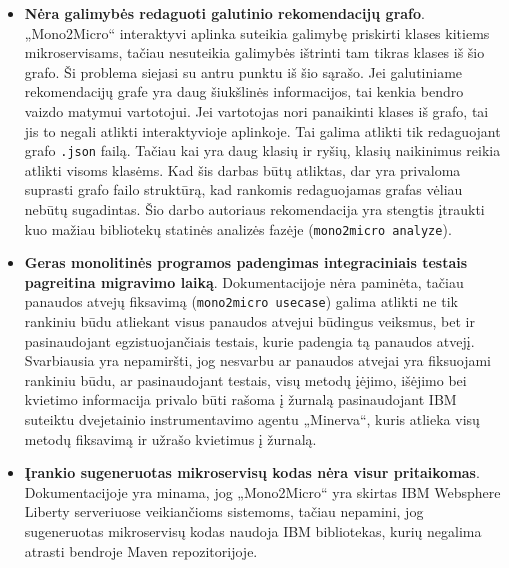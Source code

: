 \documentclass{VUMIFPSbakalaurinis}
\begin{document}
\begin{itemize}
    \item \textbf{Nėra galimybės redaguoti galutinio rekomendacijų grafo}. „Mono2Micro“ interaktyvi aplinka suteikia galimybę priskirti klases kitiems mikroservisams, tačiau nesuteikia galimybės ištrinti tam tikras klases iš šio grafo. Ši problema siejasi su antru punktu iš šio sąrašo. Jei galutiniame rekomendacijų grafe yra daug šiukšlinės informacijos, tai kenkia bendro vaizdo matymui vartotojui. Jei vartotojas nori panaikinti klases iš grafo, tai jis to negali atlikti interaktyvioje aplinkoje. Tai galima atlikti tik redaguojant grafo \verb|.json| failą. Tačiau kai yra daug klasių ir ryšių, klasių naikinimus reikia atlikti visoms klasėms. Kad šis darbas būtų atliktas, dar yra privaloma suprasti grafo failo struktūrą, kad rankomis redaguojamas grafas vėliau nebūtų sugadintas. Šio darbo autoriaus rekomendacija yra stengtis įtraukti kuo mažiau bibliotekų statinės analizės fazėje (\verb|mono2micro analyze|).

    \item \textbf{Geras monolitinės programos padengimas integraciniais testais pagreitina migravimo laiką}. Dokumentacijoje nėra paminėta, tačiau panaudos atvejų fiksavimą (\verb|mono2micro usecase|) galima atlikti ne tik rankiniu būdu atliekant visus panaudos atvejui būdingus veiksmus, bet ir pasinaudojant egzistuojančiais testais, kurie padengia tą panaudos atvejį. Svarbiausia yra nepamiršti, jog nesvarbu ar panaudos atvejai yra fiksuojami rankiniu būdu, ar pasinaudojant testais, visų metodų įėjimo, išėjimo bei kvietimo informacija privalo būti rašoma į žurnalą pasinaudojant IBM suteiktu dvejetainio instrumentavimo agentu „Minerva“, kuris atlieka visų metodų fiksavimą ir užrašo kvietimus į žurnalą.

    \item \textbf{Įrankio sugeneruotas mikroservisų kodas nėra visur pritaikomas}. Dokumentacijoje yra minama, jog „Mono2Micro“ yra skirtas IBM Websphere Liberty serveriuose veikiančioms sistemoms, tačiau nepamini, jog sugeneruotas mikroservisų kodas naudoja IBM bibliotekas, kurių negalima atrasti bendroje Maven repozitorijoje.
\end{itemize}
\end{document}
